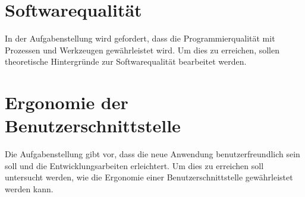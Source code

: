 \section{Softwarequalität}
In der Aufgabenstellung wird gefordert, dass die Programmierqualität mit Prozessen und Werkzeugen gewährleistet wird.
Um dies zu erreichen, sollen theoretische Hintergründe zur Softwarequalität bearbeitet werden. 

\section{Ergonomie der Benutzerschnittstelle}
Die Aufgabenstellung gibt vor, dass die neue Anwendung benutzerfreundlich sein soll und die Entwicklungsarbeiten erleichtert.
Um dies zu erreichen soll untersucht werden, wie die Ergonomie einer Benutzerschnittstelle gewährleistet werden kann.

